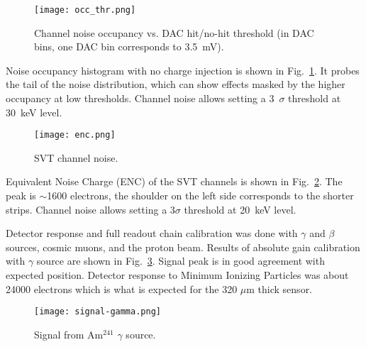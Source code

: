 \begin{figure}[hbt] 
\centering 
\texttt{[image: occ\_thr.png]}
\caption{Channel noise occupancy vs. DAC hit/no-hit threshold (in DAC bins, one DAC bin corresponds to 3.5~mV).}
\label{fig:noiseocc}
\end{figure}

Noise occupancy histogram with no charge injection is shown in Fig.~\ref{fig:noiseocc}. It probes the tail of the noise distribution, which can show effects masked by the higher occupancy at low thresholds. Channel noise allows setting a 3~$\sigma$ threshold at 30~keV level. 

\begin{figure}[hbt] 
	\centering 
	\texttt{[image: enc.png]}
	\caption{SVT channel noise.}
	\label{fig:enc}
\end{figure}

Equivalent Noise Charge (ENC) of the SVT channels is shown in  Fig.~\ref{fig:enc}. The peak is $\sim$1600 electrons, the shoulder on the left side corresponds to the shorter strips. Channel noise allows setting a 3$\sigma$ threshold at 20~keV level. 

Detector response and full readout chain calibration was done with $\gamma$ and $\beta$ sources, cosmic muons, and the proton beam. Results of absolute gain calibration with $\gamma$ source are shown in Fig.~\ref{fig:signal-gamma}. Signal peak is in good agreement with expected position. Detector response to Minimum Ionizing Particles was about 24000 electrons which is what is expected for the 320 $\mu$m thick sensor.

\begin{figure}[hbt] 
	\centering 
	\texttt{[image: signal-gamma.png]}
	\caption{Signal from Am$^{241}$ $\gamma$ source.}
	\label{fig:signal-gamma}
\end{figure}

%
%

%

